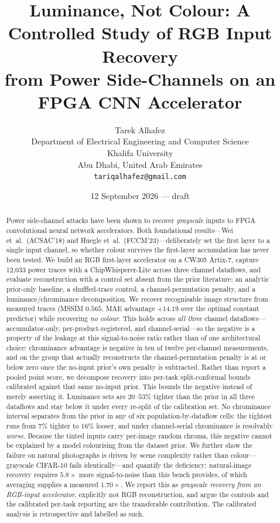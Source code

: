 \documentclass[10pt,conference]{article}
\title{\bfseries Luminance, Not Colour: A Controlled Study of RGB Input Recovery\\
from Power Side-Channels on an FPGA CNN Accelerator}
\author{%
  Tarek Alhafez\\[2pt]
  \small Department of Electrical Engineering and Computer Science\\
  \small Khalifa University\\
  \small Abu Dhabi, United Arab Emirates\\[2pt]
  \small \texttt{tariqalhafez@gmail.com}
}
\date{12 September 2026 --- draft}
\begin{document}
\maketitle

\begin{abstract}
Power side-channel attacks have been shown to recover \emph{grayscale} inputs to FPGA
convolutional neural network accelerators. Both foundational results---Wei
et~al.~(ACSAC'18) and Huegle et~al.~(FCCM'23)---deliberately set the first layer to a
single input channel, so whether colour survives the first-layer accumulation has never
been tested. We build an RGB first-layer accelerator on a CW305 Artix-7, capture 12{,}033
power traces with a ChipWhisperer-Lite across three channel dataflows, and evaluate reconstruction with a control set
absent from the prior literature: an analytic prior-only baseline, a shuffled-trace
control, a channel-permutation penalty, and a luminance/chrominance decomposition.
We recover recognisable image structure from measured traces (MSSIM $0.565$, MAE
advantage $+14.19$ over the optimal constant predictor) while recovering
\emph{no colour}. This holds across \emph{all three} channel dataflows---
accumulator-only, per-product-registered, and channel-serial---so the negative is a
property of the leakage at this signal-to-noise ratio rather than of one architectural
choice: chrominance advantage is negative in ten of twelve per-channel measurements,
and on the group that actually reconstructs the channel-permutation penalty is at or
below zero once the no-input prior's own penalty is subtracted.
Rather than report a pooled point score, we decompose recovery into per-task
split-conformal bounds calibrated against that same no-input prior. This bounds the
negative instead of merely asserting it. Luminance sets are $20$--$53\%$ tighter than
the prior in all three dataflows and stay below it under every re-split of the
calibration set. No chrominance interval separates from the prior in any of six
population-by-dataflow cells: the tightest runs from $7\%$ tighter to $16\%$ looser, and
under channel-serial chrominance is resolvably \emph{worse}.
Because the tinted inputs carry per-image random chroma, this negative cannot be
explained by a model colourising from the dataset prior. We further show the failure on
natural photographs is driven by scene complexity rather than colour---grayscale CIFAR-10
fails identically---and quantify the deficiency: natural-image recovery requires
$5.8\times$ more signal-to-noise than this bench provides, of which averaging supplies a
measured $1.70\times$. We report this as \emph{grayscale recovery from an RGB-input
accelerator}, explicitly not RGB reconstruction, and argue the controls and the
calibrated per-task reporting are the transferable contribution. The calibrated
analysis is retrospective and labelled as such.
\end{abstract}
\end{document}
